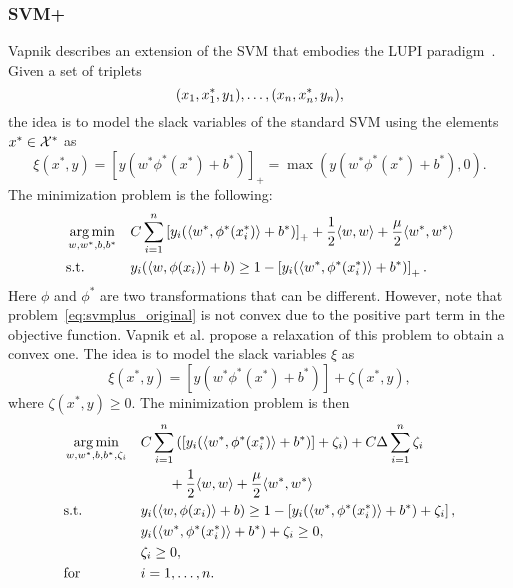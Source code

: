 \subsubsection*{SVM+ }
Vapnik describes an extension of the SVM that embodies the LUPI paradigm~\cite{VapnikV09,VapnikI15a}. Given a set of triplets
\begin{equation}
    \nonumber
    (x_1, x^*_1, y_1), \ldots, (x_n, x^*_n, y_n) ,
\end{equation}
the idea is to model the slack variables of the standard SVM using the elements $x^* \in \mathcal{X}^*$ as
$$ \xi(x^*, y) = \left[y (w^* \phi^*(x^*) + b^*) \right]_+  = \max\left( y (w^* \phi^*(x^*) + b^*), 0  \right).$$
The minimization problem is the following:
\begin{equation}
    \label{eq:svmplus_original}
    \begin{aligned}
        & \argmin_{w, w^*, b, b^*}
        & &  C \sum_{i=1}^\nsamples \left[y_i (\dotp{w^*}{\phi^*(x_i^*)} + b^*) \right]_+ + \frac{1}{2} \dotp{w}{w} + \frac{\mu}{2} \dotp{w^*}{w^*} \\
        & \text{s.t.}
        & & y_{i} ( \dotp{w}{\phi(x_{i})} + b) \geq 1 - \left[y_i (\dotp{w^*}{\phi^*(x^*_i)} + b^*) \right]_+ .
    \end{aligned}
\end{equation}
Here $\phi$ and $\phi^*$ are two transformations that can be different.
However, note that problem~\eqref{eq:svmplus_original} is not convex due to the positive part term in the objective function. Vapnik et al. propose a relaxation of this problem to obtain a convex one. The idea is to model the slack variables $\xi$ as
$$ \xi(x^*, y) = \left[y (w^* \phi^*(x^*) + b^*) \right] + \zeta(x^*, y) ,$$
where $\zeta(x^*, y) \geq 0$.
The minimization problem is then
\begin{equation}
    \label{eq:svmplus_delta_primal}
    \begin{aligned}
        & \argmin_{w, w^*, b, b^*, \zeta_i}
        & &  C \sum_{i=1}^\nsamples \left( \left[y_i (\dotp{w^*}{\phi^*(x_i^*)} + b^*) \right] + \zeta_i \right) + C \Delta \sum_{i=1}^\nsamples \zeta_i \\
        & & &\qquad + \frac{1}{2} \dotp{w}{w} + \frac{\mu}{2} \dotp{w^*}{w^*} \\
        & \text{s.t.}
        & & y_{i} ( \dotp{w}{\phi(x_{i})} + b) \geq 1 - \left[y_i (\dotp{w^*}{\phi^*(x^*_i)} + b^*) + \zeta_i \right] ,\\
        & & &y_i (\dotp{w^*}{\phi^*(x^*_i)} + b^*) + \zeta_i \geq 0 ,\\
        & & &\zeta_i \geq 0, \\
        & \text{for } & & i=1, \ldots, \nsamples.
    \end{aligned}
\end{equation}
